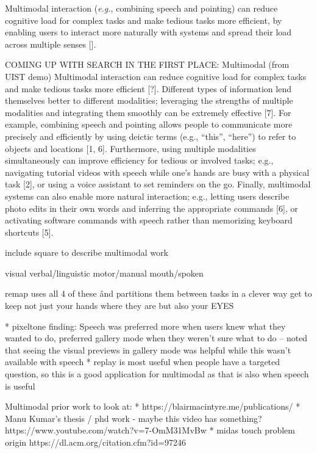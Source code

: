 Multimodal interaction (\textit{e.g.}, combining speech and pointing) can reduce cognitive load for complex tasks and make tedious tasks more efficient, by enabling users to interact more naturally with systems and spread their load across multiple senses []. 

COMING UP WITH SEARCH IN THE FIRST PLACE: Multimodal (from UIST demo)
Multimodal interaction can reduce cognitive load for complex tasks and make tedious tasks more efficient [?]. Different types of information lend themselves better to different modalities; leveraging the strengths of multiple modalities and integrating them smoothly can be extremely effective [7]. For example, combining speech and pointing allows people to communicate more precisely and efficiently by using deictic terms (e.g., “this”, “here”) to refer to objects and locations [1, 6]. Furthermore, using multiple modalities simultaneously can improve efficiency for tedious or involved tasks; e.g., navigating tutorial videos with speech while one’s hands are busy with a physical task [2], or using a voice assistant to set reminders on the go. Finally, multimodal systems can also enable more natural interaction; e.g., letting users describe photo edits in their own words and inferring the appropriate commands [6], or activating software commands with speech rather than memorizing keyboard shortcuts [5].

include square to describe multimodal work

visual                     verbal/linguistic
motor/manual       mouth/spoken

remap uses all 4 of these \^ and partitions them between tasks in a clever way
get to keep not just your hands where they are but also your EYES


* pixeltone finding: Speech was preferred more when users knew what they wanted to do, preferred gallery mode when they weren’t sure what to do -- noted that seeing the visual previews in gallery mode was helpful while this wasn’t available with speech
    * replay is most useful when people have a targeted question, so this is a good application for multimodal as that is also when speech is useful
    
    
Multimodal prior work to look at:
* https://blairmacintyre.me/publications/
* Manu Kumar’s thesis / phd work - maybe this video has something? https://www.youtube.com/watch?v=7-OmM31MvBw
* midas touch problem origin https://dl.acm.org/citation.cfm?id=97246